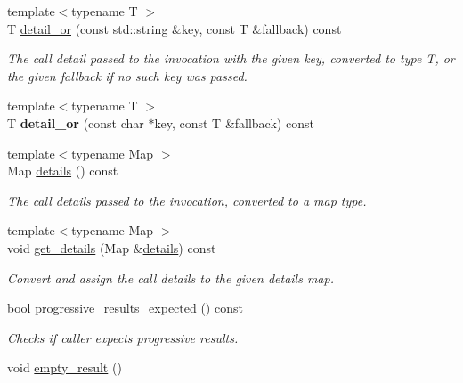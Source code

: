 \begin{DoxyCompactItemize}
\item 
{\footnotesize template$<$typename T $>$ }\\T \hyperlink{classautobahn_1_1wamp__invocation__impl_a1dc8fbbb25c5fd923224a5d09cf9c7a2}{detail\+\_\+or} (const std\+::string \&key, const T \&fallback) const 
\begin{DoxyCompactList}\small\item\em The call detail passed to the invocation with the given {\ttfamily key}, converted to type T, or the given {\ttfamily fallback} if no such key was passed. \end{DoxyCompactList}\item 
{\footnotesize template$<$typename T $>$ }\\T {\bfseries detail\+\_\+or} (const char $\ast$key, const T \&fallback) const \hypertarget{classautobahn_1_1wamp__invocation__impl_a95ca45b44f1d365d221b86248215d4cf}{}\label{classautobahn_1_1wamp__invocation__impl_a95ca45b44f1d365d221b86248215d4cf}

\item 
{\footnotesize template$<$typename Map $>$ }\\Map \hyperlink{classautobahn_1_1wamp__invocation__impl_a6013b21bcf71387c88bc4248412a034e}{details} () const 
\begin{DoxyCompactList}\small\item\em The call details passed to the invocation, converted to a map type. \end{DoxyCompactList}\item 
{\footnotesize template$<$typename Map $>$ }\\void \hyperlink{classautobahn_1_1wamp__invocation__impl_ab859b2ec483ca85bddf4d98a47d5d87f}{get\+\_\+details} (Map \&\hyperlink{classautobahn_1_1wamp__invocation__impl_a6013b21bcf71387c88bc4248412a034e}{details}) const 
\begin{DoxyCompactList}\small\item\em Convert and assign the call details to the given {\ttfamily details} map. \end{DoxyCompactList}\item 
bool \hyperlink{classautobahn_1_1wamp__invocation__impl_af538aed0130f6b1c53220c3529bb5d07}{progressive\+\_\+results\+\_\+expected} () const \hypertarget{classautobahn_1_1wamp__invocation__impl_af538aed0130f6b1c53220c3529bb5d07}{}\label{classautobahn_1_1wamp__invocation__impl_af538aed0130f6b1c53220c3529bb5d07}

\begin{DoxyCompactList}\small\item\em Checks if caller expects progressive results. \end{DoxyCompactList}\item 
void \hyperlink{classautobahn_1_1wamp__invocation__impl_aa4463f05ec6d414531cbd59bfc988190}{empty\+\_\+result} ()\hypertarget{classautobahn_1_1wamp__invocation__impl_aa4463f05ec6d414531cbd59bfc988190}{}\label{classautobahn_1_1wamp__invocation__impl_aa4463f05ec6d414531cbd59bfc988190}


\end{DoxyCompactItemize}

